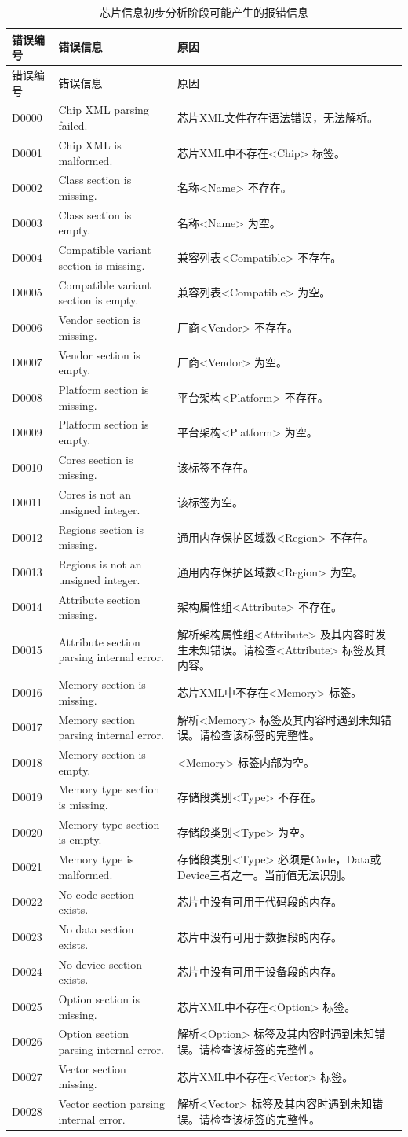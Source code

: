\begin{xltabular}{\textwidth}{@{}>{\hsize\raggedright\arraybackslash}X>{\hsize\raggedright\arraybackslash}X>{\hsize\raggedright\arraybackslash}X@{}}
\caption{芯片信息初步分析阶段可能产生的报错信息}\label{tab:5-17}\\
\toprule
错误编号 & 错误信息 & 原因\tabularnewline
\endfirsthead
\toprule
错误编号 & 错误信息 & 原因\tabularnewline
\midrule
\endhead
\bottomrule
\endlastfoot
D0000 & Chip XML parsing failed. &
芯片XML文件存在语法错误，无法解析。\tabularnewline
D0001 & Chip XML is malformed. &
芯片XML中不存在<Chip> 标签。\tabularnewline
D0002 & Class section is missing. &
名称<Name> 不存在。\tabularnewline
D0003 & Class section is empty. &
名称<Name> 为空。\tabularnewline
D0004 & Compatible variant section is missing. &
兼容列表<Compatible> 不存在。\tabularnewline
D0005 & Compatible variant section is empty. &
兼容列表<Compatible> 为空。\tabularnewline
D0006 & Vendor section is missing. &
厂商<Vendor> 不存在。\tabularnewline
D0007 & Vendor section is empty. &
厂商<Vendor> 为空。\tabularnewline
D0008 & Platform section is missing. &
平台架构<Platform> 不存在。\tabularnewline
D0009 & Platform section is empty. &
平台架构<Platform> 为空。\tabularnewline
D0010 & Cores section is missing. & 该标签不存在。\tabularnewline
D0011 & Cores is not an unsigned integer. & 该标签为空。\tabularnewline
D0012 & Regions section is missing. &
通用内存保护区域数<Region> 不存在。\tabularnewline
D0013 & Regions is not an unsigned integer. &
通用内存保护区域数<Region> 为空。\tabularnewline
D0014 & Attribute section missing. &
架构属性组<Attribute> 不存在。\tabularnewline
D0015 & Attribute section parsing internal error. &
解析架构属性组<Attribute> 及其内容时发生未知错误。请检查<Attribute> 标签及其内容。\tabularnewline
D0016 & Memory section is missing. &
芯片XML中不存在<Memory> 标签。\tabularnewline
D0017 & Memory section parsing internal error. &
解析<Memory> 标签及其内容时遇到未知错误。请检查该标签的完整性。\tabularnewline
D0018 & Memory section is empty. &
<Memory> 标签内部为空。\tabularnewline
D0019 & Memory type section is missing. &
存储段类别<Type> 不存在。\tabularnewline
D0020 & Memory type section is empty. &
存储段类别<Type> 为空。\tabularnewline
D0021 & Memory type is malformed. &
存储段类别<Type> 必须是Code，Data或Device三者之一。当前值无法识别。\tabularnewline
D0022 & No code section exists. &
芯片中没有可用于代码段的内存。\tabularnewline
D0023 & No data section exists. &
芯片中没有可用于数据段的内存。\tabularnewline
D0024 & No device section exists. &
芯片中没有可用于设备段的内存。\tabularnewline
D0025 & Option section is missing. &
芯片XML中不存在<Option> 标签。\tabularnewline
D0026 & Option section parsing internal error. &
解析<Option> 标签及其内容时遇到未知错误。请检查该标签的完整性。\tabularnewline
D0027 & Vector section missing. &
芯片XML中不存在<Vector> 标签。\tabularnewline
D0028 & Vector section parsing internal error. &
解析<Vector> 标签及其内容时遇到未知错误。请检查该标签的完整性。\tabularnewline
\end{xltabular}

